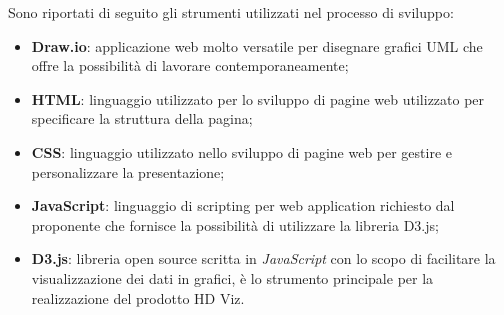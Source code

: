 Sono riportati di seguito gli strumenti utilizzati nel processo di sviluppo:
\begin{itemize}
	\item \textbf{Draw.io}: applicazione web molto versatile per disegnare grafici UML che offre la possibilità di lavorare
		contemporaneamente;
	\item \textbf{HTML}: linguaggio utilizzato per lo sviluppo di pagine web utilizzato per specificare la struttura della pagina;
	\item \textbf{CSS}: linguaggio utilizzato nello sviluppo di pagine web per gestire e personalizzare la presentazione;
	\item \textbf{JavaScript}: linguaggio di scripting per web application richiesto dal proponente che fornisce la possibilità di
		utilizzare la libreria D3.js;
	\item \textbf{D3.js}: libreria open source scritta in \emph{JavaScript} con lo scopo di facilitare la visualizzazione dei dati in
		grafici, è lo strumento principale per la realizzazione del prodotto HD Viz.
\end{itemize}
